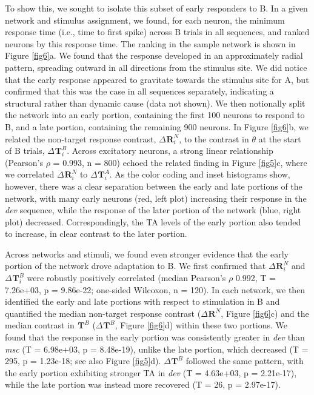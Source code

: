 \documentclass[pdflatex,referee,iicol,sn-basic]{sn-jnl}
\newcommand{\dev}{\textit{dev}}
\newcommand{\msc}{\textit{msc}}
\renewcommand{\R}[3][]{{}^{#1}_{}\!\mathbf{R}^{#2}_{#3}}
\renewcommand{\T}[3][]{{}^{#1}_{}\mathbf{T}^{#2}_{#3}}
\theoremstyle{thmstyleone}%
\theoremstyle{thmstyletwo}%
\theoremstyle{thmstylethree}%
\begin{document}
To show this, we sought to isolate this subset of early responders to B. In a given network and stimulus assignment, we found, for each neuron, the minimum response time (i.e., time to first spike) across B trials in all sequences, and ranked neurons by this response time. The ranking in the sample network is shown in Figure \ref{fig6}a. We found that the response developed in an approximately radial pattern, spreading outward in all directions from the stimulus site. We did notice that the early response appeared to gravitate towards the stimulus site for A, but confirmed that this was the case in all sequences separately, indicating a structural rather than dynamic cause (data not shown). We then notionally split the network into an early portion, containing the first 100 neurons to respond to B, and a late portion, containing the remaining 900 neurons. In Figure \ref{fig6}b, we related the non-target response contrast, $\Delta \R{N}{i}$, to the contrast in $\theta$ at the start of B trials, $\Delta \T{B}{i}$. Across excitatory neurons, a strong linear relationship (Pearson's $\rho$ = 0.993, n = 800) echoed the related finding in Figure \ref{fig5}c, where we correlated $\Delta \R{N}{i}$ to $\Delta \T{A}{i}$. As the color coding and inset histograms show, however, there was a clear separation between the early and late portions of the network, with many early neurons (red, left plot) increasing their response in the \dev{} sequence, while the response of the later portion of the network (blue, right plot) decreased. Correspondingly, the TA levels of the early portion also tended to increase, in clear contrast to the later portion.

Across networks and stimuli, we found even stronger evidence that the early portion of the network drove adaptation to B. We first confirmed that $\Delta \R{N}{i}$ and $\Delta \T{B}{i}$ were robustly positively correlated (median Pearson's $\rho$ 0.992, T = 7.26e+03, p = 9.86e-22; one-sided Wilcoxon, n = 120). In each network, we then identified the early and late portions with respect to stimulation in B and quantified the median non-target response contrast ($\Delta \R{N}{}$, Figure \ref{fig6}c) and the median contrast in $\T{B}{}$ ($\Delta \T{B}{}$, Figure \ref{fig6}d) within these two portions. We found that the response in the early portion was consistently greater in \dev{} than \msc{} (T = 6.98e+03, p = 8.48e-19), unlike the late portion, which decreased (T = 295, p = 1.23e-18; see also Figure \ref{fig5}d). $\Delta \T{B}{}$ followed the same pattern, with the early portion exhibiting stronger TA in \dev{} (T = 4.63e+03, p = 2.21e-17), while the late portion was instead more recovered (T = 26, p = 2.97e-17).
\end{document}
